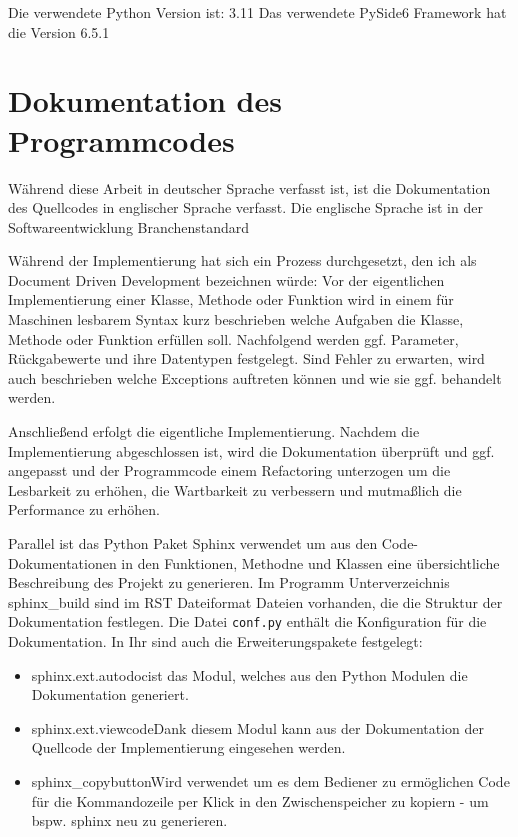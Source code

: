Die verwendete Python Version ist: 3.11
Das verwendete PySide6 Framework hat die Version 6.5.1

\section*{Dokumentation des Programmcodes}

Während diese Arbeit in deutscher Sprache verfasst ist, ist die Dokumentation des Quellcodes in englischer Sprache verfasst. 
Die englische Sprache ist in der Softwareentwicklung Branchenstandard

Während der Implementierung hat sich ein Prozess durchgesetzt, den ich als Document Driven Development bezeichnen würde:
Vor der eigentlichen Implementierung einer Klasse, Methode oder Funktion wird in einem für Maschinen lesbarem Syntax kurz beschrieben 
welche Aufgaben die Klasse, Methode oder Funktion erfüllen soll. Nachfolgend werden ggf. Parameter, Rückgabewerte und ihre Datentypen festgelegt. 
Sind Fehler zu erwarten, wird auch beschrieben welche Exceptions auftreten können und wie sie ggf. behandelt werden. 

Anschließend erfolgt die eigentliche Implementierung. Nachdem die Implementierung abgeschlossen ist, wird die Dokumentation überprüft und ggf. angepasst und
der Programmcode einem Refactoring unterzogen um die Lesbarkeit zu erhöhen, die Wartbarkeit zu verbessern und mutmaßlich die Performance zu erhöhen.

Parallel ist das Python Paket Sphinx verwendet um aus den Code-Dokumentationen in den Funktionen, 
Methodne und Klassen eine übersichtliche Beschreibung des Projekt zu generieren. 
Im Programm Unterverzeichnis \glqq sphinx\_build \grqq sind im RST Dateiformat Dateien vorhanden, 
die die Struktur der Dokumentation festlegen.
Die Datei \verb|conf.py| enthält die Konfiguration für die Dokumentation. In Ihr sind auch die Erweiterungspakete festgelegt: 

\begin{itemize}
    \item \glq sphinx.ext.autodoc\grq ist das Modul, welches aus den Python Modulen die Dokumentation generiert.
    \item \glq sphinx.ext.viewcode\grq Dank diesem Modul kann aus der Dokumentation der Quellcode der Implementierung eingesehen werden.
    \item \glq sphinx\_copybutton\grq Wird verwendet um es dem Bediener zu ermöglichen Code für die Kommandozeile per Klick in den Zwischenspeicher zu kopiern - um bspw. sphinx neu zu generieren.
\end{itemize}

